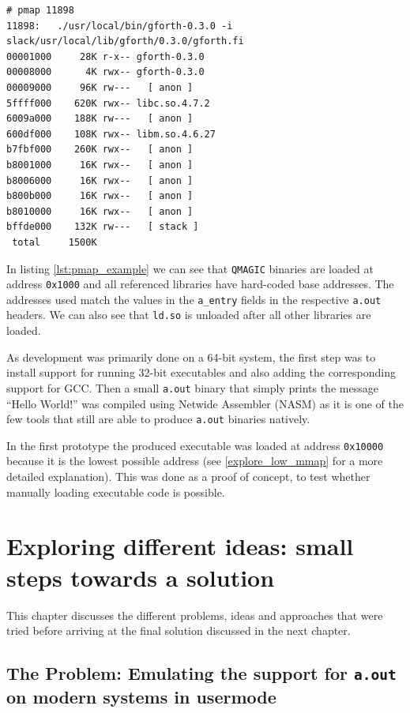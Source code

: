\documentclass[draft,final]{vutinfth} %
\begin{document}
\begin{lstlisting}[caption={Output of \texttt{pmap} showing the memory mappings of an \texttt{a.out} binary, that loads additional libraries at runtime}, label={lst:pmap_example}]
# pmap 11898
11898:   ./usr/local/bin/gforth-0.3.0 -i slack/usr/local/lib/gforth/0.3.0/gforth.fi
00001000     28K r-x-- gforth-0.3.0
00008000      4K rwx-- gforth-0.3.0
00009000     96K rw---   [ anon ]
5ffff000    620K rwx-- libc.so.4.7.2
6009a000    188K rw---   [ anon ]
600df000    108K rwx-- libm.so.4.6.27
b7fbf000    260K rwx--   [ anon ]
b8001000     16K rwx--   [ anon ]
b8006000     16K rwx--   [ anon ]
b800b000     16K rwx--   [ anon ]
b8010000     16K rwx--   [ anon ]
bffde000    132K rw---   [ stack ]
 total     1500K
\end{lstlisting}

In listing \ref{lst:pmap_example} we can see that \texttt{QMAGIC} binaries are loaded at address \texttt{0x1000} and all referenced libraries have hard-coded base addresses. The addresses used match the values in the \texttt{a\_entry} fields in the respective \texttt{a.out} headers. We can also see that \texttt{ld.so} is unloaded after all other libraries are loaded.

As development was primarily done on a 64-bit system, the first step was to install support for running 32-bit executables and also adding the corresponding support for GCC. Then a small \texttt{a.out} binary that simply prints the message ``Hello World!'' was compiled using Netwide Assembler (NASM) as it is one of the few tools that still are able to produce \texttt{a.out} binaries natively.

In the first prototype the produced executable was loaded at address \texttt{0x10000} because it is the lowest possible address (see \ref{explore_low_mmap} for a more detailed explanation). This was done as a proof of concept, to test whether manually loading executable code is possible.

\chapter{Exploring different ideas: small steps towards a solution}
\label{explore}

This chapter discusses the different problems, ideas and approaches that were tried before arriving at the final solution discussed in the next chapter.

\section{The Problem: Emulating the support for \texttt{a.out} on modern systems in usermode}
\label{the_problem}
\end{document}
